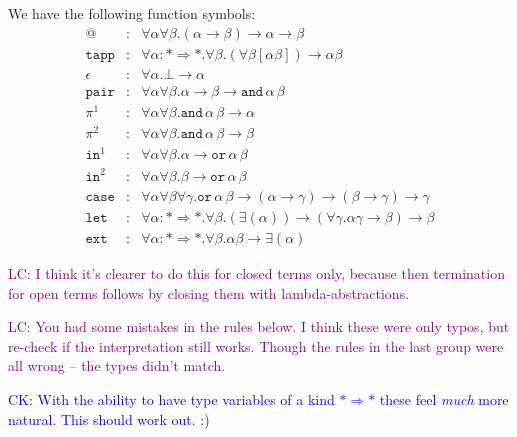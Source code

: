 \documentclass[runningheads,a4paper]{llncs}
\newcommand{\arrtype}{\rightarrow}
\newcommand{\arrkind}{\Rightarrow}
\newcommand{\CK}[1]{\textcolor{blue}{CK: #1}}
\newcommand{\LC}[1]{\textcolor{purple}{LC: #1}}
\begin{document}
We have the following function symbols:
\[
\begin{array}{rcl}
@ & : & \forall \alpha \forall \beta . (\alpha \arrtype \beta) \arrtype \alpha \arrtype \beta \\
\mathtt{tapp} & : & \forall \alpha : * \arrkind * . \forall \beta .
  (\forall \beta [\alpha \beta]) \arrtype \alpha \beta \\
\epsilon & : & \forall \alpha . \bot \arrtype \alpha \\
\mathtt{pair} & : & \forall \alpha \forall \beta . \alpha \arrtype \beta \arrtype
  \mathtt{and}\, \alpha\, \beta \\
\pi^1 & : & \forall \alpha \forall \beta . \mathtt{and}\, \alpha\, \beta \arrtype \alpha \\
\pi^2 & : & \forall \alpha \forall \beta . \mathtt{and}\, \alpha\, \beta \arrtype \beta \\
\mathtt{in}^1 & : & \forall \alpha \forall \beta . \alpha \arrtype
  \mathtt{or}\, \alpha\, \beta \\
\mathtt{in}^2 & : & \forall \alpha \forall \beta . \beta \arrtype
  \mathtt{or}\, \alpha\, \beta \\
\mathtt{case} & : & \forall \alpha \forall \beta \forall \gamma . \mathtt{or}\, \alpha\, \beta \arrtype
  (\alpha \arrtype \gamma) \arrtype (\beta \arrtype \gamma) \arrtype \gamma \\
\mathtt{let} & : & \forall \alpha : * \arrkind * . \forall \beta .
  (\exists (\alpha)) \arrtype
  (\forall \gamma . \alpha \gamma \arrtype \beta) \arrtype \beta \\
\mathtt{ext} & : & \forall \alpha : * \arrkind * . \forall \beta . \alpha \beta \arrtype
  \exists (\alpha)
\end{array}
\]

\LC{I think it's clearer to do this for closed terms only,
  because then termination for open terms follows by closing them with
  lambda-abstractions.}

\LC{You had some mistakes in the rules below. I think these were only
  typos, but re-check if the interpretation still works. Though the
  rules in the last group were all wrong -- the types didn't match.}

\CK{With the ability to have type variables of a kind $* \arrkind *$
  these feel \emph{much} more natural.  This should work out. :)}
\end{document}
